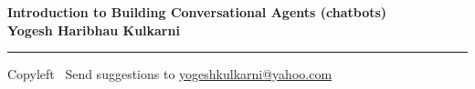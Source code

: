 
\graphicspath{{images/}}

\footnotesize


\begin{center}
\Large{\textbf{Introduction to Building Conversational Agents (chatbots)\\ Yogesh Haribhau Kulkarni}}  
\end{center}

\begin{multicols}{2}

\end{multicols}

\rule{\linewidth}{0.25pt}
\scriptsize
Copyleft \textcopyleft\  Send suggestions to 
\href{http://www.yogeshkulkarni.com}{yogeshkulkarni@yahoo.com}


